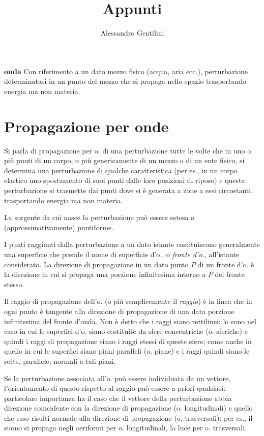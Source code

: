 \documentclass[a4paper]{article}
\begin{document}
\title{Appunti}
\author{Alessandro Gentilini}
\maketitle

\textbf{onda} Con riferimento a un dato mezzo fisico (acqua, aria ecc.), perturbazione determinatasi in un punto del mezzo che si propaga nello spazio trasportando energia ma non materia. 

\section{Propagazione per onde}

Si parla di propagazione per o. di una perturbazione tutte le volte che in uno o più punti di un corpo, o più genericamente di un mezzo o di un ente fisico, si determina una perturbazione di qualche caratteristica (per es., in un corpo elastico uno spostamento di suoi punti dalle loro posizioni di riposo) e questa perturbazione si trasmette dai punti dove si è generata a zone a essi circostanti, trasportando energia ma non materia. 

La sorgente da cui nasce la perturbazione può essere estesa o (approssimativamente) puntiforme. 

I punti raggiunti dalla perturbazione a un dato istante costituiscono generalmente una superficie che prende il nome di superficie d'o., o \textit{fronte d'o.}, all'istante considerato. La direzione di propagazione in un dato punto $P$ di un fronte d'o. è la direzione in cui si propaga una porzione infinitesima intorno a $P$ del fronte stesso. 

Il raggio di propagazione dell'o. (o più semplicemente il \textit{raggio}) è la linea che in ogni punto è tangente alla direzione di propagazione di una data porzione infinitesima del fronte d'onda. Non è detto che i raggi siano rettilinei: lo sono nel caso in cui le superfici d'o. siano costituite da sfere concentriche (o. sferiche) e quindi i raggi di propagazione siano i raggi stessi di queste sfere; come anche in quello in cui le superfici siano piani paralleli (o. piane) e i raggi quindi siano le rette, parallele, normali a tali piani. 

Se la perturbazione associata all'o. può essere individuata da un vettore, l'orientamento di questo rispetto al raggio può essere a priori qualsiasi: particolare importanza ha il caso che il vettore della perturbazione abbia direzione coincidente con la direzione di propagazione (o. longitudinali) e quello che esso risulti normale alla direzione di propagazione (o. trasversali): per es., il suono si propaga negli aeriformi per o. longitudinali, la luce per o. trasversali. 
\end{document}
